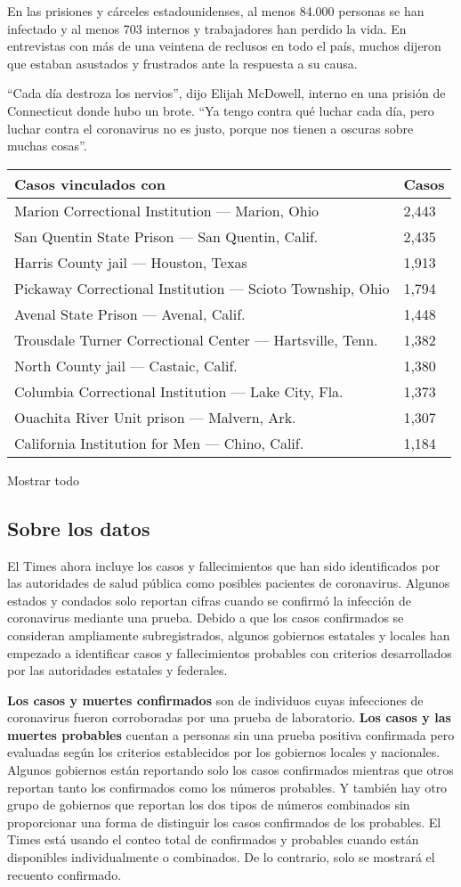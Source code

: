 En las prisiones y cárceles estadounidenses, al menos 84.000 personas se
han infectado y al menos 703 internos y trabajadores han perdido la
vida. En entrevistas con más de una veintena de reclusos en todo el
país, muchos dijeron que estaban asustados y frustrados ante la
respuesta a su causa.

``Cada día destroza los nervios'', dijo Elijah McDowell, interno en una
prisión de Connecticut donde hubo un brote. ``Ya tengo contra qué luchar
cada día, pero luchar contra el coronavirus no es justo, porque nos
tienen a oscuras sobre muchas cosas''.

\begin{longtable}[]{@{}ll@{}}
\toprule
Casos vinculados con & Casos\tabularnewline
\midrule
\endhead
Marion Correctional Institution --- Marion, Ohio & 2,443 \tabularnewline
San Quentin State Prison --- San Quentin, Calif. & 2,435 \tabularnewline
Harris County jail --- Houston, Texas & 1,913 \tabularnewline
Pickaway Correctional Institution --- Scioto Township, Ohio & 1,794
\tabularnewline
Avenal State Prison --- Avenal, Calif. & 1,448 \tabularnewline
Trousdale Turner Correctional Center --- Hartsville, Tenn. & 1,382
\tabularnewline
North County jail --- Castaic, Calif. & 1,380 \tabularnewline
Columbia Correctional Institution --- Lake City, Fla. & 1,373
\tabularnewline
Ouachita River Unit prison --- Malvern, Ark. & 1,307 \tabularnewline
California Institution for Men --- Chino, Calif. & 1,184 \tabularnewline
\bottomrule
\end{longtable}

Mostrar todo

\hypertarget{sobre-los-datos}{%
\subsection{Sobre los datos}\label{sobre-los-datos}}

El Times ahora incluye los casos y fallecimientos que han sido
identificados por las autoridades de salud pública como posibles
pacientes de coronavirus. Algunos estados y condados solo reportan
cifras cuando se confirmó la infección de coronavirus mediante una
prueba. Debido a que los casos confirmados se consideran ampliamente
subregistrados, algunos gobiernos estatales y locales han empezado a
identificar casos y fallecimientos probables con criterios desarrollados
por las autoridades estatales y federales.

\textbf{Los casos y muertes confirmados} son de individuos cuyas
infecciones de coronavirus fueron corroboradas por una prueba de
laboratorio. \textbf{Los casos y las muertes probables} cuentan a
personas sin una prueba positiva confirmada pero evaluadas según los
criterios establecidos por los gobiernos locales y nacionales. Algunos
gobiernos están reportando solo los casos confirmados mientras que otros
reportan tanto los confirmados como los números probables. Y también hay
otro grupo de gobiernos que reportan los dos tipos de números combinados
sin proporcionar una forma de distinguir los casos confirmados de los
probables. El Times está usando el conteo total de confirmados y
probables cuando están disponibles individualmente o combinados. De lo
contrario, solo se mostrará el recuento confirmado.

